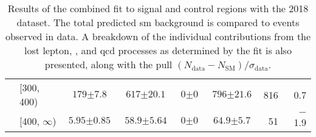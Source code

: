 \begin{table}[htbp]
\begin{tabular*}{\linewidth}{@{\extracolsep{\fill}}llccccrr}
        & [300, 400) &    $\text{179} \pm \text{7.8}$ &    $\text{617} \pm \text{20.1}$ &      $\text{0} \pm \text{0}$ &     $\text{796} \pm \text{21.6}$ &    816 & 0.7 \\
        & [400, $\infty$) &    $\text{5.95} \pm \text{0.85}$ &     $\text{58.9} \pm \text{5.64}$ &      $\text{0} \pm \text{0}$ &       $\text{64.9} \pm \text{5.7}$ &     51 & $-$1.9 \\
    \bottomrule
\end{tabular*}
\caption[Results of the combined fit to signal and control regions with the 2018 dataset. The total predicted \acrlong{sm} background is compared to events observed in data]{Results of the combined fit to signal and control regions with the 2018 dataset. The total predicted \acrlong{sm} background is compared to events observed in data. A breakdown of the individual contributions from the lost lepton, \ztonunu, and \acrshort{qcd} processes as determined by the fit is also presented, along with the \gls{pull} $(N_{\mathrm{data}} - N_{\mathrm{SM}})/\sigma_{\mathrm{data}}$.}
\label{tab:yields_SR_B_only_2018}
\end{table}
